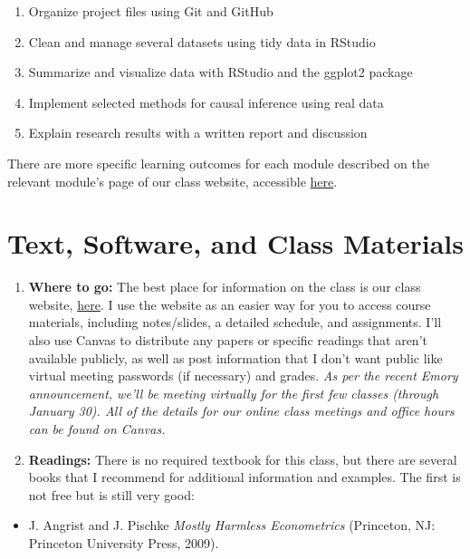\documentclass[11pt,]{article}
\providecommand{\tightlist}{%
  \setlength{\itemsep}{0pt}\setlength{\parskip}{0pt}}
\begin{document}
\begin{enumerate}
\def\labelenumi{\arabic{enumi}.}
\tightlist
\item
  Organize project files using Git and GitHub
\item
  Clean and manage several datasets using tidy data in RStudio
\item
  Summarize and visualize data with RStudio and the ggplot2 package
\item
  Implement selected methods for causal inference using real data
\item
  Explain research results with a written report and discussion
\end{enumerate}

There are more specific learning outcomes for each module described on
the relevant module's page of our class website, accessible
\href{https://econ470s22.classes.ianmccarthyecon.com/}{here}.

\hypertarget{text-software-and-class-materials}{%
\section{Text, Software, and Class
Materials}\label{text-software-and-class-materials}}

\begin{enumerate}
\def\labelenumi{\arabic{enumi}.}
\item
  \textbf{Where to go:} The best place for information on the class is
  our class website,
  \href{https://econ470s22.classes.ianmccarthyecon.com/}{here}. I use
  the website as an easier way for you to access course materials,
  including notes/slides, a detailed schedule, and assignments. I'll
  also use Canvas to distribute any papers or specific readings that
  aren't available publicly, as well as post information that I don't
  want public like virtual meeting passwords (if necessary) and grades.
  \emph{As per the recent Emory announcement, we'll be meeting virtually
  for the first few classes (through January 30). All of the details for
  our online class meetings and office hours can be found on Canvas.}
\item
  \textbf{Readings:} There is no required textbook for this class, but
  there are several books that I recommend for additional information
  and examples. The first is not free but is still very good:
\end{enumerate}

\begin{itemize}
\tightlist
\item
  J. Angrist and J. Pischke \emph{Mostly {Harmless} {Econometrics}}
  (Princeton, NJ: Princeton University Press, 2009).
\end{itemize}
\end{document}
